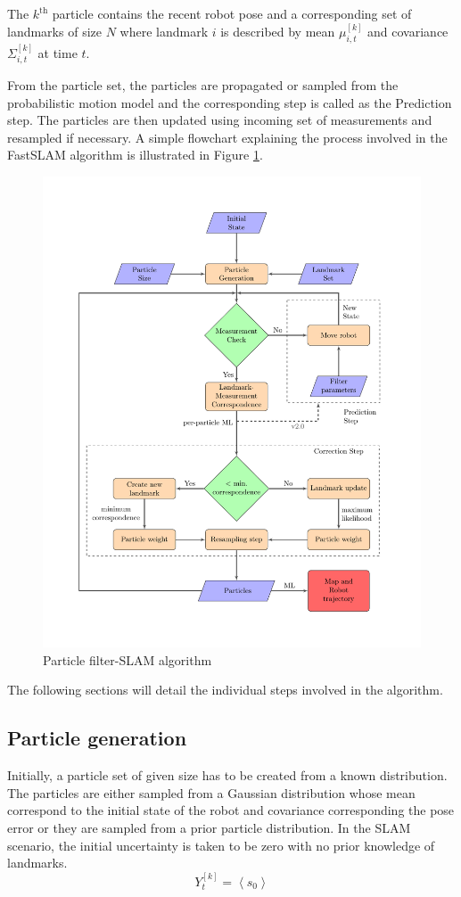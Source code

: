 The $k^{\text{th}}$ particle contains the recent robot pose and a corresponding set of landmarks of size $N$ where landmark $i$ is described by mean $\mu_{i,t}^{[k]}$ and covariance $\Sigma_{i,t}^{[k]}$ at time $t$.

From the particle set, the particles are propagated or sampled from the probabilistic motion model and the corresponding step is called as the Prediction step. The particles are then updated using incoming set of measurements and resampled if necessary. A simple flowchart explaining the process involved in the FastSLAM algorithm is illustrated in Figure \ref{flow_fs}. 
\begin{figure}
\centering
\includegraphics[scale=0.9]{./images/flow_fs}
\caption[A flowchart of particle filter-SLAM algorithm]{Particle filter-SLAM algorithm}
\label{flow_fs}
\end{figure}

The following sections will detail the individual steps involved in the algorithm.

\subsection{Particle generation}
Initially, a particle set of given size has to be created from a known distribution. The particles are either sampled from a Gaussian distribution whose mean correspond to the initial state of the robot and covariance corresponding the pose error or they are sampled from a prior particle distribution. In the SLAM scenario, the initial uncertainty is taken to be zero with no prior knowledge of landmarks.
\begin{equation}
Y_t^{[k]}=\left\langle s_0 \right\rangle
\end{equation}

